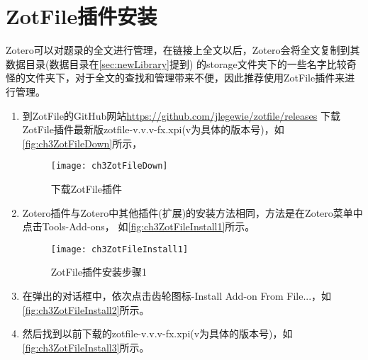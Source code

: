 \documentclass[cn,11pt,chinese]{elegantbook}
\begin{document}
		\section{ ZotFile插件安装}\label{sec:ZotFileInstall}
		Zotero可以对题录的全文进行管理，在链接上全文以后，Zotero会将全文复制到其数据目录(数据目录在\cref{sec:newLibrary}提到)
		的storage文件夹下的一些名字比较奇怪的文件夹下，对于全文的查找和管理带来不便，因此推荐使用ZotFile插件来进行管理。
		\begin{enumerate}
			\item 到ZotFile的GitHub网站\url{https://github.com/jlegewie/zotfile/releases}
			下载ZotFile插件最新版zotfile-v.v.v-fx.xpi(v为具体的版本号)，如\autoref{fig:ch3ZotFileDown}所示，
			\begin{figure}
				\centering
				\texttt{[image: ch3ZotFileDown]}
				\caption{下载ZotFile插件}
				\label{fig:ch3ZotFileDown}
			\end{figure}
			
			\item
			Zotero插件与Zotero中其他插件(扩展)的安装方法相同，方法是在Zotero菜单中点击Tools-Add-ons，
			如\autoref{fig:ch3ZotFileInstall1}所示。
			\begin{figure}[htbp]
				\centering
				\texttt{[image: ch3ZotFileInstall1]}
				\caption{ZotFile插件安装步骤1}
				\label{fig:ch3ZotFileInstall1}
			\end{figure}
			\item
			在弹出的对话框中，依次点击齿轮图标-Install Add-on From File...，如\autoref{fig:ch3ZotFileInstall2}所示。
			\item
			然后找到以前下载的zotfile-v.v.v-fx.xpi(v为具体的版本号)，如\autoref{fig:ch3ZotFileInstall3}所示。
			

\end{enumerate}
\end{document}
